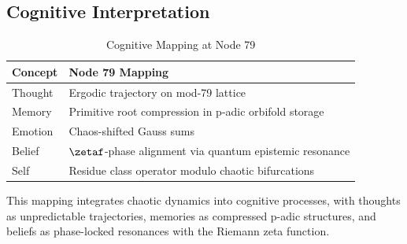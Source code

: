 \documentclass[12pt]{article}
\begin{document}
\subsection{Cognitive Interpretation}
\begin{table}
\centering
\caption{Cognitive Mapping at Node 79}
\begin{tabular}{ll}
\toprule
\textbf{Concept} & \textbf{Node 79 Mapping} \\
\midrule
Thought & Ergodic trajectory on mod-79 lattice \\
Memory & Primitive root compression in p-adic orbifold storage \\
Emotion & Chaos-shifted Gauss sums \\
Belief & $\zetaf$-phase alignment via quantum epistemic resonance \\
Self & Residue class operator modulo chaotic bifurcations \\
\bottomrule
\end{tabular}
\end{table}
This mapping integrates chaotic dynamics into cognitive processes, with thoughts as unpredictable trajectories, memories as compressed p-adic structures, and beliefs as phase-locked resonances with the Riemann zeta function.

\end{document}
